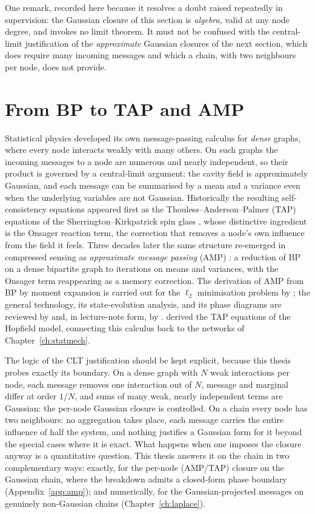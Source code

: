 One remark, recorded here because it resolves a doubt raised repeatedly
in supervision: the Gaussian closure of this section is \emph{algebra},
valid at any node degree, and invokes no limit theorem. It must not be
confused with the central-limit justification of the \emph{approximate}
Gaussian closures of the next section, which does require many incoming
messages and which a chain, with two neighbours per node, does not
provide.

\section{From BP to TAP and AMP}\label{sec:amp-intro}

Statistical physics developed its own message-passing calculus for
\emph{dense} graphs, where every node interacts weakly with many others.
On such graphs the incoming messages to a node are numerous and nearly
independent, so their product is governed by a central-limit argument:
the cavity field is approximately Gaussian, and each message can be
summarised by a mean and a variance even when the underlying variables
are not Gaussian. Historically the resulting self-consistency equations
appeared first as the Thouless--Anderson--Palmer (TAP) equations of the
Sherrington--Kirkpatrick spin glass \citep{thouless1977solution}, whose
distinctive ingredient is the Onsager reaction term, the correction that
removes a node's own influence from the field it feels. Three decades
later the same structure re-emerged in compressed sensing as
\emph{approximate message passing} (AMP) \citep{donoho2009message}: a
reduction of BP on a dense bipartite graph to iterations on means and
variances, with the Onsager term reappearing as a memory correction. The
derivation of AMP from BP by moment expansion is carried out for the
$\ell_2$ minimisation problem by \citet{genovese2026amp}; the general
technology, its state-evolution analysis, and its phase diagrams are
reviewed by \citet{zdeborova2016statistical} and, in lecture-note form,
by \citet{krzakala2024statphys}. \citet{mezard2017meanfield} derived the
TAP equations of the Hopfield model, connecting this calculus back to the
networks of Chapter~\ref{ch:statmech}.

The logic of the CLT justification should be kept explicit, because this
thesis probes exactly its boundary. On a dense graph with $N$ weak
interactions per node, each message removes one interaction out of $N$,
message and marginal differ at order $1/N$, and sums of many weak,
nearly independent terms are Gaussian: the per-node Gaussian closure is
controlled. On a chain every node has two neighbours: no aggregation
takes place, each message carries the entire influence of half the
system, and nothing justifies a Gaussian form for it beyond the special
cases where it is exact. What happens when one imposes the closure
anyway is a quantitative question. This thesis answers it on the chain
in two complementary ways: exactly, for the per-node (AMP/TAP) closure
on the Gaussian chain, where the breakdown admits a closed-form phase
boundary (Appendix~\ref{app:amp}); and numerically, for the
Gaussian-projected messages on genuinely non-Gaussian chains
(Chapter~\ref{ch:laplace}).

